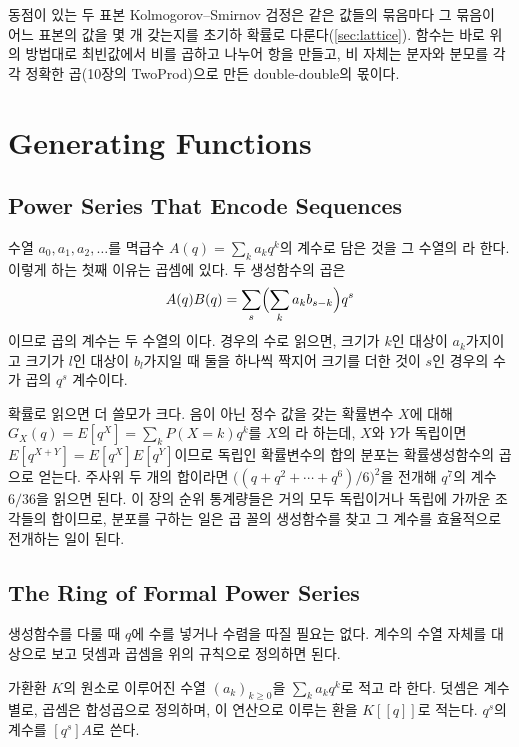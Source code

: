 \begin{instardust}
동점이 있는 두 표본 Kolmogorov--Smirnov 검정은 같은 값들의 묶음마다 그 묶음이 어느 표본의 값을 몇 개 갖는지를 초기하 확률로 다룬다(\cref{sec:lattice}).  함수는 바로 위의 방법대로 최빈값에서 비를 곱하고 나누어 항을 만들고, 비 자체는 분자와 분모를 각각 정확한 곱(10장의 TwoProd)으로 만든 double-double의 몫이다.
\end{instardust}

\section{Generating Functions}
\label{sec:gf}

\subsection{Power Series That Encode Sequences}

수열 $a_0,a_1,a_2,\dots$를 멱급수 $A(q)=\sum_ka_kq^k$의 계수로 담은 것을 그 수열의 라 한다. 이렇게 하는 첫째 이유는 곱셈에 있다. 두 생성함수의 곱은
\[
A(q)B(q)=\sum_s\Bigl(\sum_{k}a_kb_{s-k}\Bigr)q^s
\]
이므로 곱의 계수는 두 수열의 이다. 경우의 수로 읽으면, 크기가 $k$인 대상이 $a_k$가지이고 크기가 $l$인 대상이 $b_l$가지일 때 둘을 하나씩 짝지어 크기를 더한 것이 $s$인 경우의 수가 곱의 $q^s$ 계수이다.

확률로 읽으면 더 쓸모가 크다. 음이 아닌 정수 값을 갖는 확률변수 $X$에 대해 $G_X(q)=E[q^X]=\sum_kP(X=k)q^k$를 $X$의 라 하는데, $X$와 $Y$가 독립이면 $E[q^{X+Y}]=E[q^X]E[q^Y]$이므로 독립인 확률변수의 합의 분포는 확률생성함수의 곱으로 얻는다. 주사위 두 개의 합이라면 $\bigl((q+q^2+\cdots+q^6)/6\bigr)^2$을 전개해 $q^7$의 계수 $6/36$을 읽으면 된다. 이 장의 순위 통계량들은 거의 모두 독립이거나 독립에 가까운 조각들의 합이므로, 분포를 구하는 일은 곱 꼴의 생성함수를 찾고 그 계수를 효율적으로 전개하는 일이 된다.

\subsection{The Ring of Formal Power Series}

생성함수를 다룰 때 $q$에 수를 넣거나 수렴을 따질 필요는 없다. 계수의 수열 자체를 대상으로 보고 덧셈과 곱셈을 위의 규칙으로 정의하면 된다.

\begin{definition}
\label{def:formal-power-series}
가환환 $K$의 원소로 이루어진 수열 $(a_k)_{k\ge0}$을 $\sum_ka_kq^k$로 적고 라 한다. 덧셈은 계수별로, 곱셈은 합성곱으로 정의하며, 이 연산으로 이루는 환을 $K[[q]]$로 적는다. $q^s$의 계수를 $[q^s]A$로 쓴다.
\end{definition}

